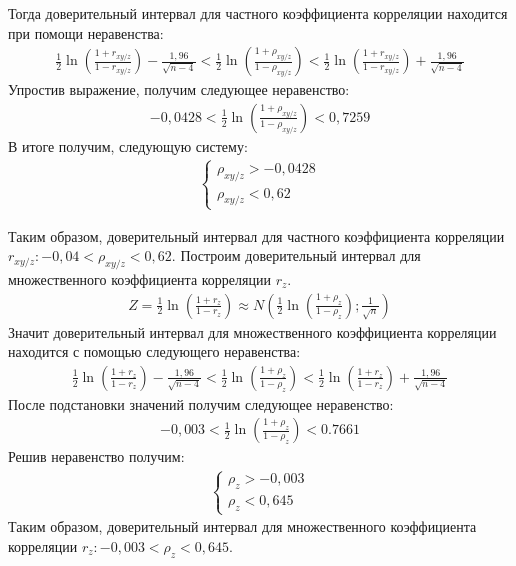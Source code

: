 \documentclass[utf8, a4paper, 14pt, russian, oneside]{book}
\begin{document}
Тогда доверительный интервал для частного коэффициента корреляции находится при помощи неравенства:
\begin{gather*}
    \frac{1}{2} \ln \left(
        \frac{1+r_{xy/z}}{1-r_{xy/z}}
    \right)
    -
    \frac{1,96}{\sqrt{n-4}}
    <
    \frac{1}{2} \ln \left(
        \frac{1+\rho_{xy/z}}{1-\rho_{xy/z}}
    \right)
    <
    \frac{1}{2} \ln \left(
        \frac{1+r_{xy/z}}{1-r_{xy/z}}
    \right)
    +
    \frac{1,96}{\sqrt{n-4}}
\end{gather*}
Упростив выражение, получим следующее неравенство:
\begin{gather*}
    -0,0428
    <
    \frac{1}{2} \ln \left(
        \frac{1+\rho_{xy/z}}{1-\rho_{xy/z}}
    \right)
    <
    0,7259
\end{gather*}
В итоге получим, следующую систему:
\begin{gather*}
    \begin{cases}
        \rho_{xy/z} > -0,0428   \\
        \rho_{xy/z} < 0,62
    \end{cases}
\end{gather*}

Таким образом, доверительный интервал для частного коэффициента корреляции $r_{xy/z}: -0,04 < \rho_{xy/z} < 0,62$.
Построим доверительный интервал для множественного коэффициента корреляции $r_z$.
\begin{gather*}
    Z=\frac{1}{2}\ln\left(
        \frac{1+r_z}{1-r_z}
    \right) \approx N\left(
        \frac{1}{2}\ln\left(
            \frac{1+\rho_z}{1-\rho_z}
        \right);\frac{1}{\sqrt{n}}
    \right)
\end{gather*}
Значит доверительный интервал для множественного коэффициента корреляции находится с помощью следующего неравенства:
\begin{gather*}
    \frac{1}{2} \ln \left(
        \frac{1+r_{z}}{1-r_{z}}
    \right)
    -
    \frac{1,96}{\sqrt{n-4}}
    <
    \frac{1}{2} \ln \left(
        \frac{1+\rho_{z}}{1-\rho_{z}}
    \right)
    <
    \frac{1}{2} \ln \left(
        \frac{1+r_{z}}{1-r_{z}}
    \right)
    +
    \frac{1,96}{\sqrt{n-4}}
\end{gather*}
После подстановки значений получим следующее неравенство:
\begin{gather*}
    -0,003
    <
    \frac{1}{2} \ln \left(
        \frac{1+\rho_{z}}{1-\rho_{z}}
    \right)
    <
    0.7661
\end{gather*}
Решив неравенство получим:
\begin{gather*}
    \begin{cases}
        \rho_z > -0,003\\
        \rho_z < 0,645
    \end{cases}
\end{gather*}
Таким образом, доверительный интервал для множественного коэффициента корреляции $r_z: -0,003 < \rho_z < 0,645$.
 
\end{document}
